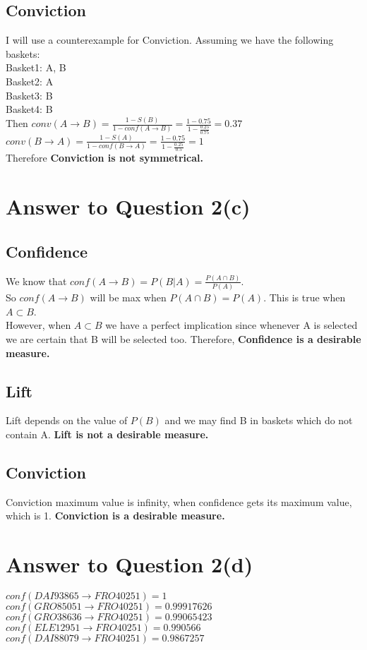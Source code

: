 \documentclass[11pt]{article}
\begin{document}
\subsection*{Conviction}
I will use a counterexample for Conviction. Assuming we have the following baskets:\\
Basket1: A, B \\
Basket2: A\\
Basket3: B\\
Basket4: B\\
Then $ conv(A \rightarrow B) = \frac{1-S(B)}{1 - conf(A \rightarrow B)} = \frac{1 - 0.75}{1 - \frac{0.25}{0.75}} = 0.37$ \\
$ conv(B \rightarrow A) = \frac{1-S(A)}{1 - conf(B \rightarrow A)} = \frac{1 - 0.75}{1 - \frac{0.25}{0.5}} = 1$\\
 Therefore \textbf{Conviction is not symmetrical.}
\pagebreak[4]
\section*{Answer to Question 2(c)}
\subsection*{Confidence}
We know that
$conf( A \rightarrow B) = P(B|A) = \frac{P(A\cap B)}{P(A)}$. \\
So  $conf( A \rightarrow B)$ will be max when $P(A\cap B) = P(A)$. This is true when $A\subset B$.\\
However, when $A\subset B$ we have a perfect implication since whenever A is selected we are certain that B will be selected too. Therefore, \textbf{Confidence is a desirable measure.}
\subsection*{Lift}
Lift depends on the value of $P(B)$ and we may find B in baskets which do not contain A. \textbf{Lift is not a desirable measure.}
\subsection*{Conviction}
Conviction maximum value is infinity, when confidence gets its maximum value, which is 1. \textbf{Conviction is a desirable measure.}
\pagebreak[4]
\section*{Answer to Question 2(d)}
$conf(DAI93865 \rightarrow FRO40251) =	1$ \\
$conf(GRO85051 \rightarrow FRO40251) =	0.99917626$ \\
$conf(GRO38636 \rightarrow FRO40251) =	0.99065423$ \\
$conf(ELE12951 \rightarrow FRO40251) =	0.990566 $\\
$conf(DAI88079 \rightarrow FRO40251) =	0.9867257$ \\
\end{document}
